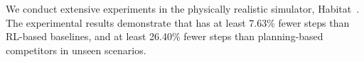 
We conduct extensive experiments in the physically realistic simulator, Habitat~\cite{habitat}. The experimental results demonstrate that {\name} has at least 7.63\% fewer steps than RL-based baselines, and at least 26.40\% fewer steps than planning-based competitors in unseen scenarios.






